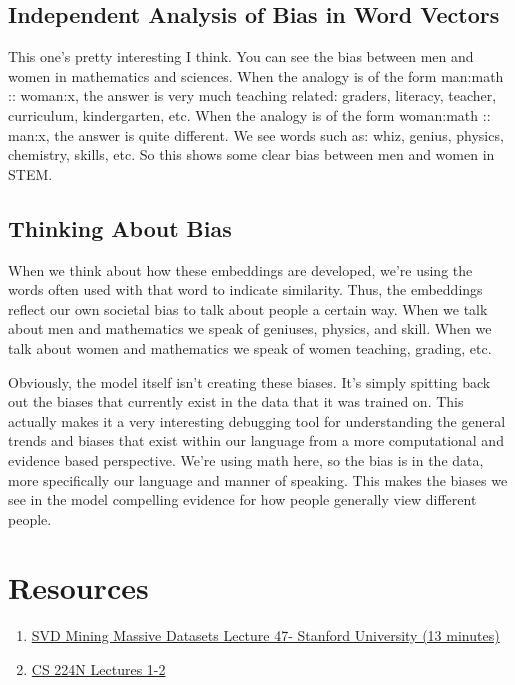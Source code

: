 \documentclass[12pt]{article}
\begin{document}
\subsection{Independent Analysis of Bias in Word Vectors}
This one's pretty interesting I think. You can see the bias between men and women in mathematics 
and sciences. When the analogy is of the form man:math :: woman:x, the answer is very much 
teaching related: graders, literacy, teacher, curriculum, kindergarten, etc. When the analogy is 
of the form woman:math :: man:x, the answer is quite different. We see words such as: whiz, genius, 
physics, chemistry, skills, etc. So this shows some clear bias between men and women in STEM. 

\subsection{Thinking About Bias}
When we think about how these embeddings are developed, we're using the words often used with that
word to indicate similarity. Thus, the embeddings reflect our own societal bias to talk about people
a certain way. When we talk about men and mathematics we speak of geniuses, physics, and skill. When 
we talk about women and mathematics we speak of women teaching, grading, etc.

Obviously, the model itself isn't creating these biases. It's simply spitting back out the biases 
that currently exist in the data that it was trained on. This actually makes it a very interesting 
debugging tool for understanding the general trends and biases that exist within our language from 
a more computational and evidence based perspective. We're using math here, so the bias is in the data, 
more specifically our language and manner of speaking. This makes the biases we see in the model 
compelling evidence for how people generally view different people. 

\section{Resources}
\begin{enumerate}
    \item \href{https://www.youtube.com/watch?v=P5mlg91as1c}{SVD Mining Massive Datasets Lecture 47- Stanford University (13 minutes)}
    \item \href{https://web.stanford.edu/class/cs224n/}{CS 224N Lectures 1-2}
\end{enumerate}
\end{document}
